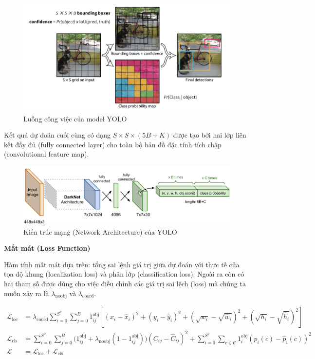\documentclass{report}
\begin{document}
\begin{figure}[h!]
	\includegraphics[scale=0.5]{yolo.png}
	\caption{Luồng công việc của model YOLO}
\end{figure}

\setlength{\parindent}{1cm}
Kết quả dự đoán cuối cùng có dạng $S \times S \times (5B + K) $ được tạo bởi hai lớp liên kết đầy đủ (fully connected layer) cho toàn bộ bản đồ đặc tính tích chập (convolutional feature map).


\begin{figure}[h!]
	\includegraphics[scale=0.325]{yolona.png}
	\caption{Kiến trúc mạng (Network Architecture) của YOLO}
\end{figure}


\bigskip
\setlength{\parindent}{0.5cm}
\textbf{Mất mát (Loss Function)}


\setlength{\parindent}{1cm}
\smallskip
Hàm tính mất mát dựa trên: tổng sai lệnh giá trị giữa dự đoán với thực tế của tọa độ khung (localization loss) và phân lớp (classification loss). Ngoài ra còn có hai tham số được dùng cho việc điều chỉnh các giá trị sai lệch (loss) mà chúng ta muốn xảy ra là $\lambda_\text{noobj}$ và $\lambda_\text{coord}$.


$
\begin{aligned}
	\mathcal{L}_\text{loc} &= \lambda_\text{coord} \sum_{i=0}^{S^2} \sum_{j=0}^B {1}_{ij}^\text{obj} [(x_i - \hat{x}_i)^2 + (y_i - \hat{y}_i)^2 + (\sqrt{w_i} - \sqrt{\hat{w}_i})^2 + (\sqrt{h_i} - \sqrt{\hat{h}_i})^2 ] \\
	\mathcal{L}_\text{cls}  &= \sum_{i=0}^{S^2} \sum_{j=0}^B \big( {1}_{ij}^\text{obj} + \lambda_\text{noobj} (1 - {1}_{ij}^\text{obj})\big) (C_{ij} - \hat{C}_{ij})^2 + \sum_{i=0}^{S^2} \sum_{c \in \mathcal{C}} {1}_i^\text{obj} (p_i(c) - \hat{p}_i(c))^2\\
	\mathcal{L} &= \mathcal{L}_\text{loc} + \mathcal{L}_\text{cls}
\end{aligned} 
$
\end{document}
